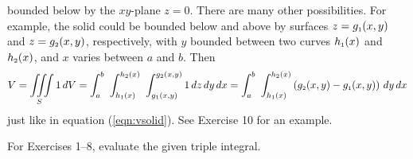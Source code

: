 bounded below by the $xy$-plane $z=0$. There are many other possibilities. For example, the solid could be bounded
below and above by surfaces $z=g_{\scriptscriptstyle 1}(x,y)$ and $z=g_{\scriptscriptstyle 2}(x,y)$, respectively, with $y$ bounded between
two curves $h_{\scriptscriptstyle 1}(x)$ and $h_{\scriptscriptstyle 2}(x)$, and $x$ varies between $a$ and $b$. Then
\begin{displaymath}
 V = \iiint\limits_{S} 1\,dV =
  \int_{a}^{b}\,\, 
  \int_{h_{\scriptscriptstyle 1}(x)}^{h_{\scriptscriptstyle 2}(x)}\,\, 
  \int_{g_{\scriptscriptstyle 1}(x,y)}^{g_{\scriptscriptstyle 2}(x,y)} 1\,dz\,dy\,dx 
  =
  \int_{a}^{b}\,\, 
  \int_{h_{\scriptscriptstyle 1}(x)}^{h_{\scriptscriptstyle 2}(x)} 
  \left( g_{\scriptscriptstyle 2}(x,y) - g_{\scriptscriptstyle 1}(x,y) \right) \,dy\,dx
\end{displaymath}
just like in equation (\ref{eqn:vsolid}). See Exercise 10 for an example.
\startexercises\label{sec3dot3}
\par\noindent For Exercises 1--8, evaluate the given triple integral.
